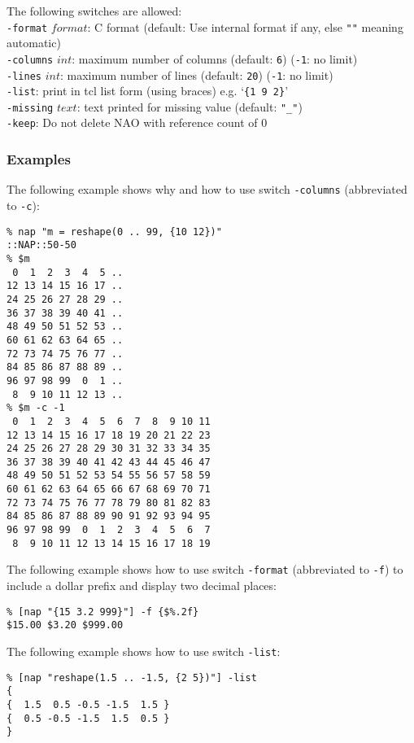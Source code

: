 The following switches are allowed:
  \\
  \texttt{-format} 
  $format$: C format (default: Use internal format if any,
  else \texttt{""} meaning automatic)
  \\
  \texttt{-columns} 
  $int$: maximum number of columns (default: 
  \texttt{6}) (\texttt{-1}: no limit)
  \\
  \texttt{-lines} 
  $int$: maximum number of lines (default: 
  \texttt{20}) (\texttt{-1}: no limit)
  \\
  \texttt{-list}: print in tcl list form (using braces) e.g. `\texttt{\{1 9 2\}}'
  \\
  \texttt{-missing} 
  $text$: text printed for missing value (default: 
  \texttt{"\_"})
  \\
  \texttt{-keep}: Do not delete NAO with reference count of 0

\subsubsection{Examples}

The following example shows why and how to use
  switch 
  \texttt{-columns} (abbreviated to 
  \texttt{-c}):
  \begin{verbatim}
% nap "m = reshape(0 .. 99, {10 12})"
::NAP::50-50
% $m
 0  1  2  3  4  5 ..
12 13 14 15 16 17 ..
24 25 26 27 28 29 ..
36 37 38 39 40 41 ..
48 49 50 51 52 53 ..
60 61 62 63 64 65 ..
72 73 74 75 76 77 ..
84 85 86 87 88 89 ..
96 97 98 99  0  1 ..
 8  9 10 11 12 13 ..
% $m -c -1
 0  1  2  3  4  5  6  7  8  9 10 11
12 13 14 15 16 17 18 19 20 21 22 23
24 25 26 27 28 29 30 31 32 33 34 35
36 37 38 39 40 41 42 43 44 45 46 47
48 49 50 51 52 53 54 55 56 57 58 59
60 61 62 63 64 65 66 67 68 69 70 71
72 73 74 75 76 77 78 79 80 81 82 83
84 85 86 87 88 89 90 91 92 93 94 95
96 97 98 99  0  1  2  3  4  5  6  7
 8  9 10 11 12 13 14 15 16 17 18 19
\end{verbatim}

  

The following example shows how to use switch 
  \texttt{-format} (abbreviated to 
  \texttt{-f}) to include a dollar prefix and display two decimal
  places:
  \begin{verbatim}
% [nap "{15 3.2 999}"] -f {$%.2f}
$15.00 $3.20 $999.00
\end{verbatim}

  

The following example shows how to use switch 
  \texttt{-list}:
  \begin{verbatim}
% [nap "reshape(1.5 .. -1.5, {2 5})"] -list
{
{  1.5  0.5 -0.5 -1.5  1.5 }
{  0.5 -0.5 -1.5  1.5  0.5 }
}
\end{verbatim}

